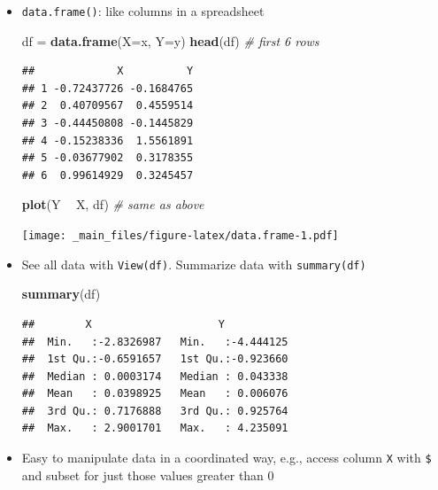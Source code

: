 \documentclass[]{article}
\newenvironment{Shaded}{\begin{snugshade}}{\end{snugshade}}
\newcommand{\KeywordTok}[1]{\textcolor[rgb]{0.13,0.29,0.53}{\textbf{#1}}}
\newcommand{\DataTypeTok}[1]{\textcolor[rgb]{0.13,0.29,0.53}{#1}}
\newcommand{\StringTok}[1]{\textcolor[rgb]{0.31,0.60,0.02}{#1}}
\newcommand{\CommentTok}[1]{\textcolor[rgb]{0.56,0.35,0.01}{\textit{#1}}}
\newcommand{\OperatorTok}[1]{\textcolor[rgb]{0.81,0.36,0.00}{\textbf{#1}}}
\newcommand{\NormalTok}[1]{#1}
\theoremstyle{definition}
\theoremstyle{definition}
\theoremstyle{remark}
\begin{document}
\begin{itemize}
\item
  \texttt{data.frame()}: like columns in a spreadsheet

\begin{Shaded}
\begin{Highlighting}[]
\NormalTok{df =}\StringTok{ }\KeywordTok{data.frame}\NormalTok{(}\DataTypeTok{X=}\NormalTok{x, }\DataTypeTok{Y=}\NormalTok{y)}
\KeywordTok{head}\NormalTok{(df)           }\CommentTok{# first 6 rows}
\end{Highlighting}
\end{Shaded}

\begin{verbatim}
##             X          Y
## 1 -0.72437726 -0.1684765
## 2  0.40709567  0.4559514
## 3 -0.44450808 -0.1445829
## 4 -0.15238336  1.5561891
## 5 -0.03677902  0.3178355
## 6  0.99614929  0.3245457
\end{verbatim}

\begin{Shaded}
\begin{Highlighting}[]
\KeywordTok{plot}\NormalTok{(Y }\OperatorTok{~}\StringTok{ }\NormalTok{X, df)    }\CommentTok{# same as above}
\end{Highlighting}
\end{Shaded}

  \texttt{[image: \_main\_files/figure-latex/data.frame-1.pdf]}
\item
  See all data with \texttt{View(df)}. Summarize data with
  \texttt{summary(df)}

\begin{Shaded}
\begin{Highlighting}[]
\KeywordTok{summary}\NormalTok{(df)}
\end{Highlighting}
\end{Shaded}

\begin{verbatim}
##        X                    Y            
##  Min.   :-2.8326987   Min.   :-4.444125  
##  1st Qu.:-0.6591657   1st Qu.:-0.923660  
##  Median : 0.0003174   Median : 0.043338  
##  Mean   : 0.0398925   Mean   : 0.006076  
##  3rd Qu.: 0.7176888   3rd Qu.: 0.925764  
##  Max.   : 2.9001701   Max.   : 4.235091
\end{verbatim}
\item
  Easy to manipulate data in a coordinated way, e.g., access column
  \texttt{X} with \texttt{\$} and subset for just those values greater
  than 0


\end{itemize}
\end{document}
